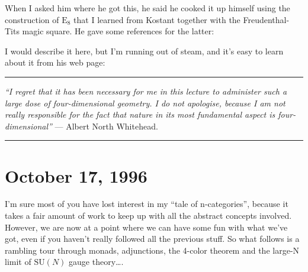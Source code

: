 \documentclass{article}
\def\tightlist{}
\renewcommand{\texttt}[1]{%
  \begingroup
  \ttfamily
  \begingroup\lccode`~=`/\lowercase{\endgroup\def~}{/\discretionary{}{}{}}%
  \begingroup\lccode`~=`[\lowercase{\endgroup\def~}{[\discretionary{}{}{}}%
  \begingroup\lccode`~=`.\lowercase{\endgroup\def~}{.\discretionary{}{}{}}%
  \catcode`/=\active\catcode`[=\active\catcode`.=\active
  \scantokens{#1\noexpand}%
  \endgroup
}
\begin{document}
When I asked him where he got this, he said he cooked it up himself
using the construction of \(\mathrm{E}_8\) that I learned from Kostant
together with the Freudenthal-Tits magic square. He gave some references
for the latter:


I would describe it here, but I'm running out of steam, and it's easy to
learn about it from his web page:


\begin{center}\rule{0.5\linewidth}{0.5pt}\end{center}

\emph{``I regret that it has been necessary for me in this lecture to
administer such a large dose of four-dimensional geometry. I do not
apologise, because I am not really responsible for the fact that nature
in its most fundamental aspect is four-dimensional''} --- Albert North
Whitehead.

\begin{center}\rule{0.5\linewidth}{0.5pt}\end{center}



\hypertarget{week92}{%
\section{October 17, 1996}\label{week92}}

I'm sure most of you have lost interest in my ``tale of n-categories'',
because it takes a fair amount of work to keep up with all the abstract
concepts involved. However, we are now at a point where we can have some
fun with what we've got, even if you haven't really followed all the
previous stuff. So what follows is a rambling tour through monads,
adjunctions, the 4-color theorem and the large-N limit of
\(\mathrm{SU}(N)\) gauge theory\ldots.
\end{document}
